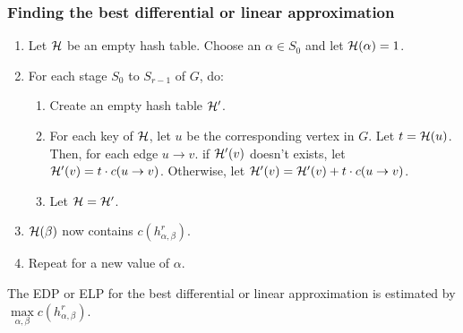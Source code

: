 \subsubsection{Finding the best differential or linear approximation}
\begin{enumerate}
    \item Let $\mathcal{H}$ be an empty hash table. Choose an $\alpha\in S_0$ and let $\mathcal{H}(\alpha)=1$.
    \item For each stage $S_0$ to $S_{r-1}$ of $G$, do:
    \begin{enumerate}
        \item Create an empty hash table $\mathcal{H}'$.
        \item For each key of $\mathcal{H}$, let $u$ be the corresponding vertex in $G$. Let $t=\mathcal{H}(u)$. Then, for each edge $u\rightarrow v$. if $\mathcal{H}'(v)$ doesn't exists, let $\mathcal{H}'(v)=t\cdot c(u\rightarrow v)$. Otherwise, let $\mathcal{H}'(v)=\mathcal{H}'(v)+t\cdot c(u\rightarrow v)$.
        \item Let $\mathcal{H}=\mathcal{H}'$.
    \end{enumerate}
    \item $\mathcal{H}(\beta)$ now contains $c(h^r_{\alpha,\beta})$.
    \item Repeat for a new value of $\alpha$.
\end{enumerate}
The EDP or ELP for the best differential or linear approximation is estimated by $\max\limits_{\alpha,\beta}c(h^r_{\alpha,\beta})$.
